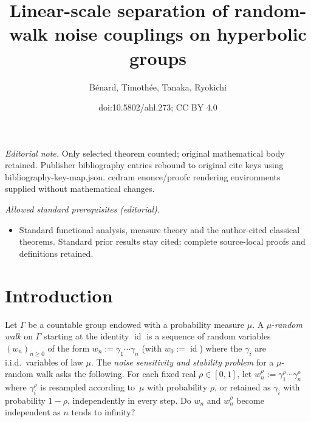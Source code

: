 \documentclass[10pt]{amsart}
\title{Linear-scale separation of random-walk noise couplings on hyperbolic groups}
\author{Bénard, Timothée, Tanaka, Ryokichi}
\date{doi:10.5802/ahl.273; CC BY 4.0}
\theoremstyle{definition}\newtheorem{defi}[theo]{Definition}\newtheorem{rema}[theo]{Remark}\newtheorem{exam}[theo]{Example}\newtheorem{exem}[theo]{Example}\newtheorem{nota}[theo]{Notation}
\DeclareMathOperator{\id}{id}
\renewcommand{\(}{\left(}
\renewcommand{\)}{\right)}
\begin{document}
\maketitle
\noindent\textit{Editorial note.} Only selected theorem counted; original mathematical body retained. Publisher bibliography entries rebound to original cite keys using bibliography-key-map.json. cedram enonce/proofc rendering environments supplied without mathematical changes.\par\medskip
\noindent\textit{Allowed standard prerequisites (editorial).}\begin{itemize}
\item Standard functional analysis, measure theory and the author-cited classical theorems. Standard prior results stay cited; complete source-local proofs and definitions retained.
\end{itemize}\medskip




\section{Introduction}

Let $\Gamma$ be a countable group endowed with a probability measure $\mu$. A $\mu$-\emph{random walk} on $\Gamma$ starting at the identity $\id$ is a sequence of random variables $(w_{n})_{n\geq 0}$ of the form $w_n:=\gamma_1\cdots \gamma_n$ (with $w_0:=\id$) where the $\gamma_{i}$ are i.i.d.\ variables of law $\mu$. The \emph{noise sensitivity and stability problem} for a $\mu$-random walk asks the following. For each fixed real $\rho \in [0, 1]$, let $w_n^\rho:=\gamma_1^\rho\cdots \gamma_n^\rho$ where $\gamma_i^\rho$ is resampled according to~$\mu$ with probability $\rho$, or retained as $\gamma_i$ with probability $1-\rho$, independently in every step. Do $w_n$ and $w_n^\rho$ become independent as $n$ tends to infinity?
\end{document}

